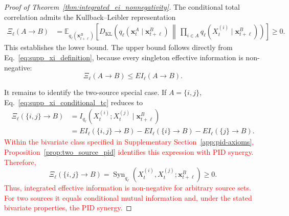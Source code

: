 \documentclass[fleqn,10pt]{wlscirep}
\newcommand{\rev}[1]{\textcolor{red}{#1}}
\begin{document}
\begin{proof}[Proof of Theorem~\ref{thm:integrated_ei_nonnegativity}]
The conditional total correlation admits the Kullback--Leibler
representation
\begin{align}
    \Xi_{\ell}(A\rightarrow B)
    &=
    \mathbb{E}_{
        q_{\ell}(\boldsymbol{x}_{t+\ell}^{B})
    }
    \left[
        D_{\mathrm{KL}}
        \left(
            q_{\ell}
            \left(
                \boldsymbol{x}_{t}^{A}
                \mid
                \boldsymbol{x}_{t+\ell}^{B}
            \right)
            \,\middle\|\,
            \prod_{i\in A}
            q_{\ell}
            \left(
                X_t^{(i)}
                \mid
                \boldsymbol{x}_{t+\ell}^{B}
            \right)
        \right)
    \right]
    \geq0.
    \label{eq:supp_xi_kl}
\end{align}
This establishes the lower bound. The upper bound follows directly from
Eq.~\eqref{eq:supp_xi_definition}, because every singleton effective
information is non-negative:
\begin{equation}
    \Xi_{\ell}(A\rightarrow B)
    \leq
    EI_{\ell}(A\rightarrow B).
    \label{eq:supp_xi_upper_bound}
\end{equation}

It remains to identify the two-source special case. If
\(A=\{i,j\}\), Eq.~\eqref{eq:supp_xi_conditional_tc} reduces to
\begin{align}
    \Xi_{\ell}(\{i,j\}\rightarrow B)
    &=
    I_{q_{\ell}}
    \left(
        X_t^{(i)};
        X_t^{(j)}
        \mid
        \boldsymbol{x}_{t+\ell}^{B}
    \right)
    \nonumber\\
    &=
    EI_{\ell}(\{i,j\}\rightarrow B)
    -
    EI_{\ell}(\{i\}\rightarrow B)
    -
    EI_{\ell}(\{j\}\rightarrow B).
    \label{eq:supp_two_source_xi}
\end{align}
\rev{Within the bivariate class specified in Supplementary Section~\ref{app:pid-axioms}, Proposition~\ref{prop:two_source_pid} identifies this expression with PID synergy. Therefore,}
\begin{equation}
    \Xi_{\ell}(\{i,j\}\rightarrow B)
    =
    \operatorname{Syn}_{q_{\ell}}
    \left(
        X_t^{(i)},X_t^{(j)};
        \boldsymbol{x}_{t+\ell}^{B}
    \right)
    \geq0.
    \label{eq:supp_xi_equals_synergy}
\end{equation}
\rev{Thus, integrated effective information is non-negative for arbitrary source sets. For two sources it equals conditional mutual information and, under the stated bivariate properties, the PID synergy.}
\end{proof}
\end{document}

